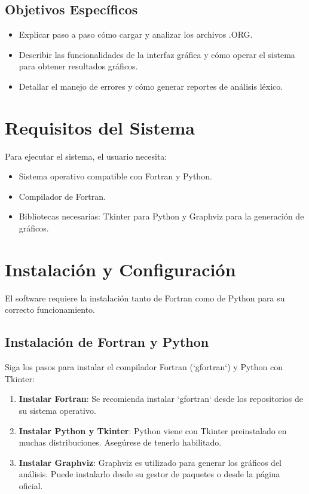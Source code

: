 \documentclass[12pt, letterpaper, twosite]{article}
\begin{document}
\subsection{Objetivos Específicos}
\begin{itemize}
    \item Explicar paso a paso cómo cargar y analizar los archivos .ORG.
    \item Describir las funcionalidades de la interfaz gráfica y cómo operar el sistema para obtener resultados gráficos.
    \item Detallar el manejo de errores y cómo generar reportes de análisis léxico.
\end{itemize}

\section{Requisitos del Sistema}
Para ejecutar el sistema, el usuario necesita:
\begin{itemize}
    \item Sistema operativo compatible con Fortran y Python.
    \item Compilador de Fortran.
    \item Bibliotecas necesarias: Tkinter para Python y Graphviz para la generación de gráficos.
\end{itemize}

\section{Instalación y Configuración}
El software requiere la instalación tanto de Fortran como de Python para su correcto funcionamiento.

\subsection{Instalación de Fortran y Python}
Siga los pasos para instalar el compilador Fortran (`gfortran`) y Python con Tkinter:
\begin{enumerate}
    \item \textbf{Instalar Fortran}: Se recomienda instalar `gfortran` desde los repositorios de su sistema operativo.
    \item \textbf{Instalar Python y Tkinter}: Python viene con Tkinter preinstalado en muchas distribuciones. Asegúrese de tenerlo habilitado.
    \item \textbf{Instalar Graphviz}: Graphviz es utilizado para generar los gráficos del análisis. Puede instalarlo desde su gestor de paquetes o desde la página oficial.
\end{enumerate}
\end{document}
